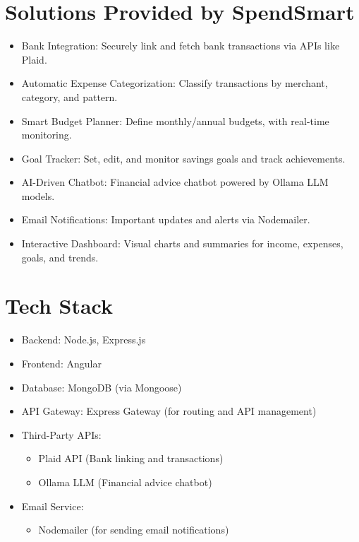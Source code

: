 \documentclass{article}
\begin{document}
\section{Solutions Provided by SpendSmart}
\begin{itemize}
    \item Bank Integration: Securely link and fetch bank transactions via APIs like Plaid.
    \item Automatic Expense Categorization: Classify transactions by merchant, category, and pattern.
    \item Smart Budget Planner: Define monthly/annual budgets, with real-time monitoring.
    \item Goal Tracker: Set, edit, and monitor savings goals and track achievements.
    \item AI-Driven Chatbot: Financial advice chatbot powered by Ollama LLM models.
    \item Email Notifications: Important updates and alerts via Nodemailer.
    \item Interactive Dashboard: Visual charts and summaries for income, expenses, goals, and trends.
\end{itemize}

\section{Tech Stack}
\begin{itemize}
    \item Backend: Node.js, Express.js
    \item Frontend: Angular
    \item Database: MongoDB (via Mongoose)
    \item API Gateway: Express Gateway (for routing and API management)
    \item Third-Party APIs:
    \begin{itemize}
        \item Plaid API (Bank linking and transactions)
        \item Ollama LLM (Financial advice chatbot)
    \end{itemize}
    \item Email Service:
    \begin{itemize}
        \item Nodemailer (for sending email notifications)
    \end{itemize}
\end{itemize}
\end{document}

